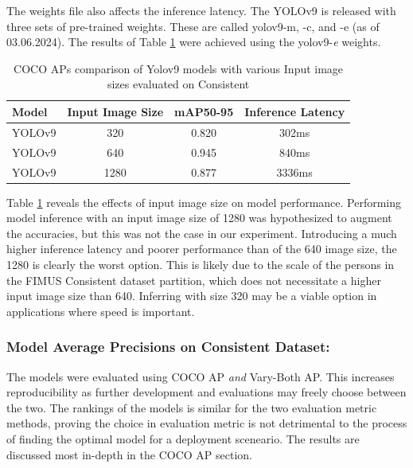 The weights file also affects the inference latency. The YOLOv9 is released with three sets of pre-trained weights. These are called yolov9-m, -c, and -e (as of 03.06.2024). The results of Table \ref{tab:APs_imagesize} were achieved using the yolov9-\textit{e} weights. 

\begin{table}[H]
    \centering
    \renewcommand{\arraystretch}{1.5}
    \setlength{\tabcolsep}{1em}
    \begin{tabular}{|l|c|c|c|}
        \hline
        \rowcolor{gray!25}
        \textbf{Model} & \textbf{Input Image Size}& \textbf{mAP50-95} & \textbf{Inference Latency} \\ \hline
        YOLOv9          & 320  & 0.820 & 302ms  \\ \hline
        YOLOv9          & 640  & 0.945 & 840ms  \\ \hline
        YOLOv9          & 1280 & 0.877 & 3336ms \\ \hline
    \end{tabular}
    \caption{COCO APs comparison of Yolov9 models with various Input image sizes evaluated on Consistent}
    \label{tab:APs_imagesize}
\end{table}

Table \ref{tab:APs_imagesize} reveals the effects of input image size on model performance. Performing model inference with an input image size of 1280 was hypothesized to augment the accuracies, but this was not the case in our experiment. Introducing a much higher inference latency and poorer performance than of the 640 image size, the 1280 is clearly the worst option. This is likely due to the scale of the persons in the FIMUS Consistent dataset partition, which does not necessitate a higher input image size than 640. Inferring with size 320 may be a viable option in applications where speed is important.  

\subsubsection{Model Average Precisions on Consistent Dataset:}
The models were evaluated using COCO AP \textit{and} Vary-Both AP. This increases reproducibility as further development and evaluations may freely choose between the two. The rankings of the models is similar for the two evaluation metric methods, proving the choice in evaluation metric is not detrimental to the process of finding the optimal model for a deployment sceneario. The results are discussed most in-depth in the COCO AP section.

